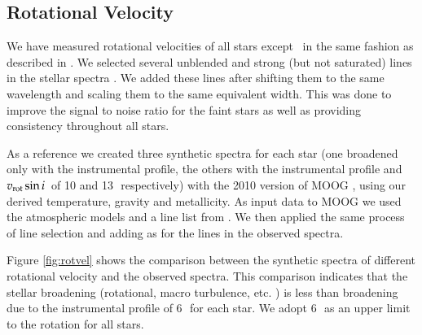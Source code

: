 \subsection{Rotational Velocity}
\label{sec:rotation}
We have measured rotational velocities of all stars except \starb\ in the same fashion as described in \wek. We selected several unblended and strong (but not saturated)  lines in the stellar spectra .  We added these lines after shifting them to the same wavelength and scaling them to the same equivalent width. This was done to improve the signal to noise ratio for the faint stars as well as providing consistency throughout all stars. 

 As a reference we created three synthetic spectra for each star (one broadened only with the instrumental profile, the others with the instrumental profile and $v_{\rm{rot}}\sin{i}$\ of 10 and 13\,\kms\ respectively) with the 2010 version of MOOG \citemoog, using our derived temperature, gravity and metallicity.  As input data to MOOG we used the \citet{2004astro.ph..5087C} atmospheric models and a line list from \citet{1995KurCD..23.....K}. We then applied the same process of line selection and adding as for the lines in the observed spectra. 
 
Figure \ref{fig:rotvel} shows the comparison between the synthetic spectra of different rotational velocity and the observed spectra. This comparison indicates that the stellar broadening (rotational, macro turbulence, etc. ) is less than broadening due to the instrumental profile of 6\,\kms\ for each star. We adopt 6\,\kms\ as an upper limit to the rotation for all stars.



